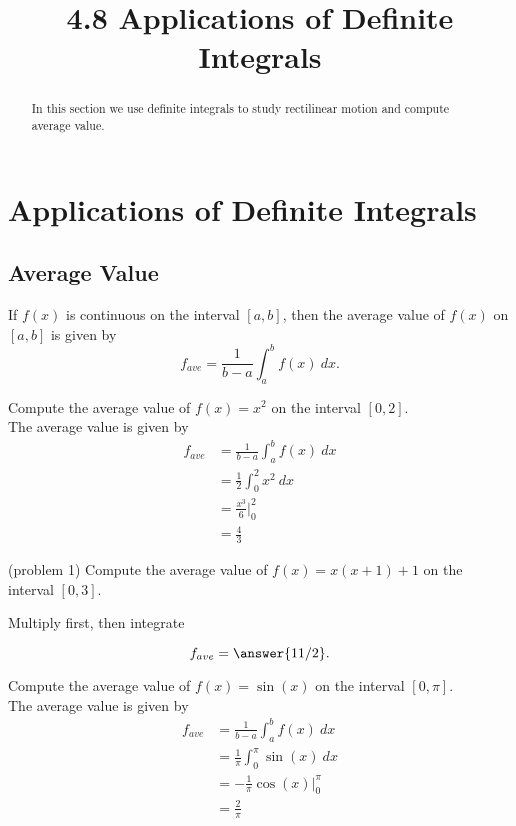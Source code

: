 \documentclass{ximera}
\title{4.8 Applications of Definite Integrals}
\begin{document}
\begin{abstract}
In this section we use definite integrals to study rectilinear motion and compute average value.
\end{abstract}

\maketitle



\section{Applications of Definite Integrals}


\subsection{Average Value}
\begin{definition}
If $f(x)$ is continuous on the interval $[a,b]$, then the average value 
of $f(x)$ on $[a,b]$ is given by
\[f_{ave} = \frac{1}{b-a}\int_a^b f(x) \ dx.\]
\end{definition}



\begin{example}[example 1]
Compute the average value of $f(x) = x^2$ on the interval $[0,2]$.\\
The average value is given by 
\begin{align*}
f_{ave} &= \frac{1}{b-a}\int_a^b f(x) \ dx \\
 & = \frac12\int_0^2 x^2 \ dx \\
 & = \frac{x^3}{6} \Bigg|_0^2 \\
  & = \tfrac43
\end{align*}
\end{example}



\begin{problem}(problem 1)
Compute the average value of $f(x) = x(x+1) +1$ on the interval $[0,3]$.
\begin{hint}
Multiply first, then integrate
\end{hint}
\[f_{ave} = \answer{11/2}.\]
\end{problem} 



\begin{example}[example 2]
Compute the average value of $f(x) = \sin(x)$ on the interval $[0,\pi]$.\\
The average value is given by 
\begin{align*}
f_{ave} &= \frac{1}{b-a}\int_a^b f(x) \ dx \\
 & = \frac{1}{\pi}\int_0^\pi \sin(x) \ dx \\
 & = -\frac{1}{\pi} \cos(x) \Bigg|_0^\pi \\
  & = \frac{2}{\pi}
\end{align*}
\end{example}
\end{document}
